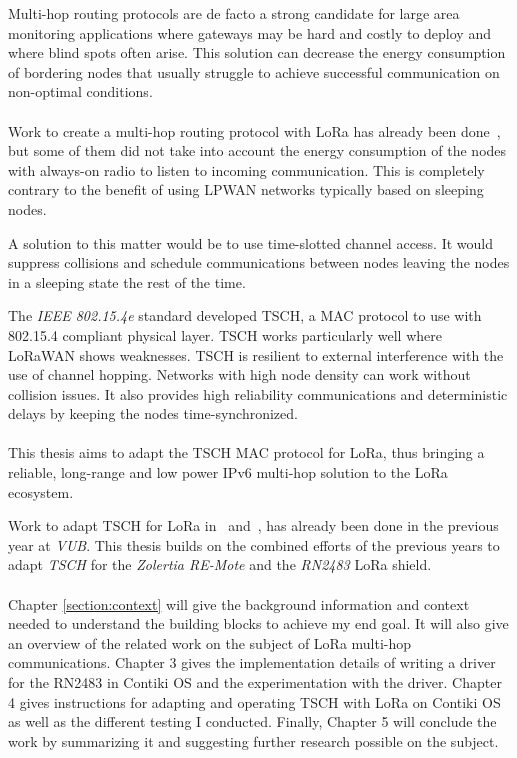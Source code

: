 Multi-hop routing protocols are de facto a strong candidate for large area monitoring 
applications where gateways may be hard and costly to deploy and where blind
spots often arise.
This solution can decrease the energy consumption of bordering nodes that
usually struggle to achieve successful communication on non-optimal
conditions.

\paragraph{}

Work to create a multi-hop routing protocol with LoRa has already been
done~\cite{8115756, DIAS2018424, 8856256, Abrardo_2019, duong2018}, 
but some of them did not take into account the energy consumption of the nodes
with always-on radio to listen to incoming communication.
This is completely contrary to the benefit of using LPWAN networks typically
based on sleeping nodes.

A solution to this matter would be to use time-slotted channel access.
It would suppress collisions and schedule communications between nodes leaving
the nodes in a sleeping state the rest of the time.

The \emph{IEEE 802.15.4e} standard developed TSCH, a MAC
protocol to use with 802.15.4 compliant physical layer.
TSCH works particularly well where LoRaWAN shows weaknesses. 
TSCH is resilient to external interference with the use of channel hopping.
Networks with high node density can work without collision issues.
It also provides high reliability communications and deterministic delays by 
keeping the nodes time-synchronized.

\paragraph{}

This thesis aims to adapt the TSCH MAC protocol for LoRa,
thus bringing a reliable, long-range and low power IPv6 multi-hop
solution to the LoRa ecosystem.

Work to adapt TSCH for LoRa in~\cite{8847137} and~\cite{njomgang_2018}, has
already been done in the previous year at \emph{VUB}.
This thesis builds on the combined efforts of the previous
years to adapt \emph{TSCH} for the \emph{Zolertia RE-Mote} and the
\emph{RN2483} LoRa shield.

\paragraph{}

Chapter \ref{section:context} will give the background information and context needed to
understand the building blocks to achieve my end goal.
It will also give an overview of the related work on the subject of
LoRa multi-hop communications.
Chapter 3 gives the implementation details of writing a driver for the
RN2483 in Contiki OS and the experimentation with the driver.
Chapter 4 gives instructions for adapting and operating TSCH with LoRa on
Contiki OS as well as the different testing I conducted.
Finally, Chapter 5 will conclude the work by summarizing it and suggesting
further research possible on the subject.
